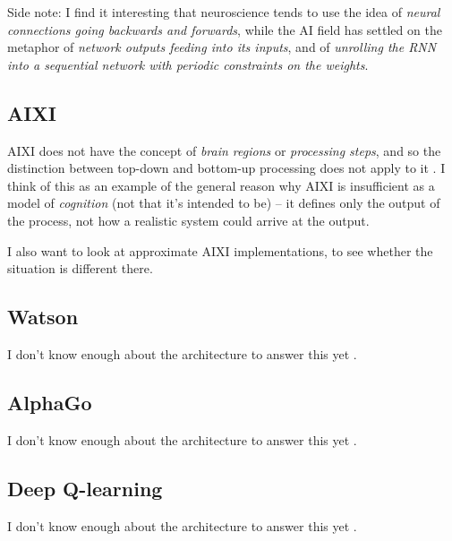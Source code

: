 \documentclass[10pt,a4paper]{article}
\begin{document}
Side note: I find it interesting that neuroscience tends to use the idea of \emph{neural connections going backwards and forwards}, while the AI field has settled on the metaphor of \emph{network outputs feeding into its inputs}, and of \emph{unrolling the RNN into a sequential network with periodic constraints on the weights}.

\subsection{AIXI}
AIXI does not have the concept of \emph{brain regions} or \emph{processing steps}, and so the distinction between top-down and bottom-up processing does not apply to it \cite{citationneeded}. I think of this as an example of the general reason why AIXI is insufficient as a model of \emph{cognition} (not that it's intended to be) -- it defines only the output of the process, not how a realistic system could arrive at the output.

I also want to look at approximate AIXI implementations, to see whether the situation is different there. \cite{researchneeded}



\subsection{Watson}
I don't know enough about the architecture to answer this yet \cite{researchneeded}.

\subsection{AlphaGo}
I don't know enough about the architecture to answer this yet \cite{researchneeded}.

\subsection{Deep Q-learning}
I don't know enough about the architecture to answer this yet \cite{researchneeded}.






\clearpage


\end{document}
